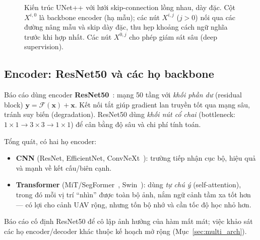 \begin{figure}[H]
{}
\caption{Kiến trúc UNet++ với lưới skip-connection lồng nhau, dày đặc. Cột $X^{i,0}$ là
backbone encoder (hạ mẫu); các nút $X^{i,j}$ ($j{>}0$) nối qua các đường nâng mẫu và
skip dày đặc, thu hẹp khoảng cách ngữ nghĩa trước khi hợp nhất. Các nút $X^{0,j}$ cho
phép giám sát sâu (deep supervision).}
\label{fig:unetpp}
\end{figure}

\subsection{Encoder: ResNet50 và các họ backbone}
Báo cáo dùng encoder \textbf{ResNet50}~\cite{he2016resnet}: mạng 50 tầng với
\emph{khối phần dư} (residual block) $\mathbf{y}=\mathcal{F}(\mathbf{x})+\mathbf{x}$.
Kết nối tắt giúp gradient lan truyền tốt qua mạng sâu, tránh suy biến (degradation).
ResNet50 dùng \emph{khối nút cổ chai} (bottleneck: $1{\times}1 \rightarrow 3{\times}3
\rightarrow 1{\times}1$) để cân bằng độ sâu và chi phí tính toán.

Tổng quát, có hai họ encoder:
\begin{itemize}[leftmargin=1.4cm]
  \item \textbf{CNN} (ResNet, EfficientNet, ConvNeXt~\cite{liu2022convnext}): trường
  tiếp nhận cục bộ, hiệu quả và mạnh về kết cấu/biên cạnh.
  \item \textbf{Transformer} (MiT/SegFormer~\cite{xie2021segformer},
  Swin~\cite{liu2021swin}): dùng \emph{tự chú ý} (self-attention), trong đó mỗi vị trí
  ``nhìn'' được toàn bộ ảnh, nắm ngữ cảnh tầm xa tốt hơn --- có lợi cho cảnh UAV rộng,
  nhưng tốn bộ nhớ và cần tốc độ học nhỏ hơn.
\end{itemize}
Báo cáo cố định ResNet50 để cô lập ảnh hưởng của hàm mất mát; việc khảo sát các họ
encoder/decoder khác thuộc kế hoạch mở rộng (Mục~\ref{sec:multi_arch}).

